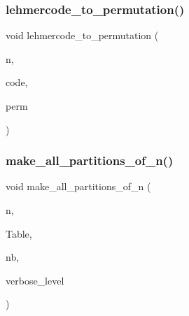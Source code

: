 \subsubsection{\texorpdfstring{lehmercode\+\_\+to\+\_\+permutation()}{lehmercode\_to\_permutation()}}
{\footnotesize\ttfamily void lehmercode\+\_\+to\+\_\+permutation (\begin{DoxyParamCaption}\item[{\mbox{\hyperlink{galois_8h_a09fddde158a3a20bd2dcadb609de11dc}{I\+NT}}}]{n,  }\item[{\mbox{\hyperlink{galois_8h_a09fddde158a3a20bd2dcadb609de11dc}{I\+NT}} $\ast$}]{code,  }\item[{\mbox{\hyperlink{galois_8h_a09fddde158a3a20bd2dcadb609de11dc}{I\+NT}} $\ast$}]{perm }\end{DoxyParamCaption})}

\mbox{\label{combinatorics_8_c_ac004d49af3c23fab0e76532f131d1663}} 
\subsubsection{\texorpdfstring{make\+\_\+all\+\_\+partitions\+\_\+of\+\_\+n()}{make\_all\_partitions\_of\_n()}}
{\footnotesize\ttfamily void make\+\_\+all\+\_\+partitions\+\_\+of\+\_\+n (\begin{DoxyParamCaption}\item[{\mbox{\hyperlink{galois_8h_a09fddde158a3a20bd2dcadb609de11dc}{I\+NT}}}]{n,  }\item[{\mbox{\hyperlink{galois_8h_a09fddde158a3a20bd2dcadb609de11dc}{I\+NT}} $\ast$\&}]{Table,  }\item[{\mbox{\hyperlink{galois_8h_a09fddde158a3a20bd2dcadb609de11dc}{I\+NT}} \&}]{nb,  }\item[{\mbox{\hyperlink{galois_8h_a09fddde158a3a20bd2dcadb609de11dc}{I\+NT}}}]{verbose\+\_\+level }\end{DoxyParamCaption})}

\mbox{\label{combinatorics_8_c_aee2f0a3e811b6c9e821fbd431f22bb7c}} 
